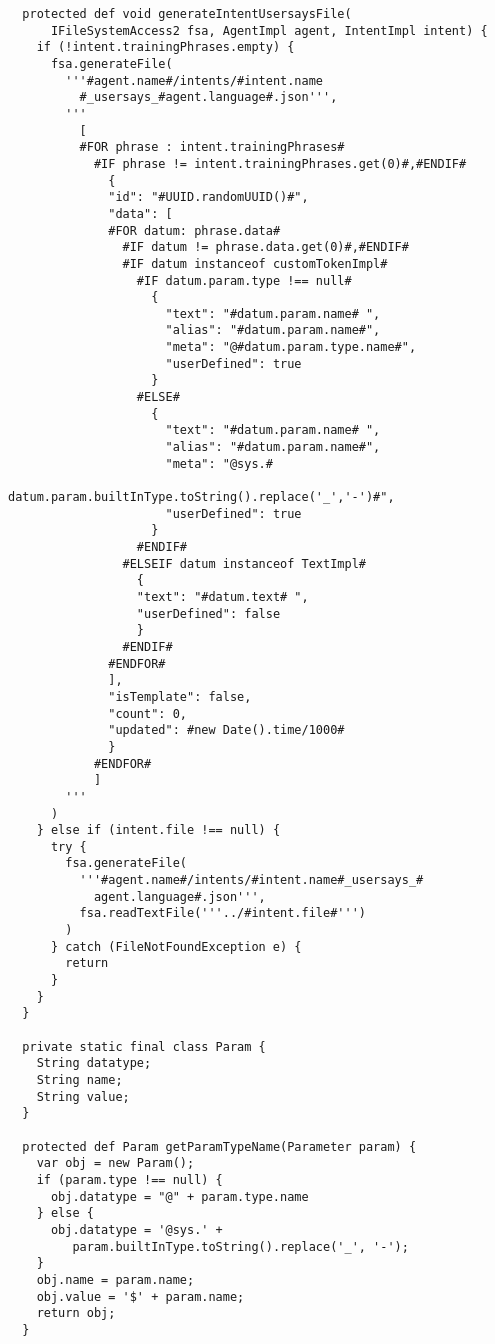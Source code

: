 \begin{lstlisting}
  protected def void generateIntentUsersaysFile(
      IFileSystemAccess2 fsa, AgentImpl agent, IntentImpl intent) {
    if (!intent.trainingPhrases.empty) {
      fsa.generateFile(
        '''#agent.name#/intents/#intent.name
          #_usersays_#agent.language#.json''',
        '''
          [
          #FOR phrase : intent.trainingPhrases#
            #IF phrase != intent.trainingPhrases.get(0)#,#ENDIF#
              {
              "id": "#UUID.randomUUID()#",
              "data": [
              #FOR datum: phrase.data#
                #IF datum != phrase.data.get(0)#,#ENDIF#
                #IF datum instanceof customTokenImpl#
                  #IF datum.param.type !== null#
                    {
                      "text": "#datum.param.name# ",
                      "alias": "#datum.param.name#",
                      "meta": "@#datum.param.type.name#",
                      "userDefined": true
                    }
                  #ELSE#
                    {
                      "text": "#datum.param.name# ",
                      "alias": "#datum.param.name#",
                      "meta": "@sys.#
                        datum.param.builtInType.toString().replace('_','-')#",
                      "userDefined": true
                    }
                  #ENDIF#
                #ELSEIF datum instanceof TextImpl#
                  {
                  "text": "#datum.text# ",
                  "userDefined": false
                  }
                #ENDIF#
              #ENDFOR#
              ],
              "isTemplate": false,
              "count": 0,
              "updated": #new Date().time/1000#
              }
            #ENDFOR#
            ]
        '''
      )
    } else if (intent.file !== null) {
      try {
        fsa.generateFile(
          '''#agent.name#/intents/#intent.name#_usersays_#
            agent.language#.json''',
          fsa.readTextFile('''../#intent.file#''')
        )
      } catch (FileNotFoundException e) {
        return
      }
    }
  }

  private static final class Param {
    String datatype;
    String name;
    String value;
  }

  protected def Param getParamTypeName(Parameter param) {
    var obj = new Param();
    if (param.type !== null) {
      obj.datatype = "@" + param.type.name
    } else {
      obj.datatype = '@sys.' +
         param.builtInType.toString().replace('_', '-');
    }
    obj.name = param.name;
    obj.value = '$' + param.name;
    return obj;
  }


\end{lstlisting}
